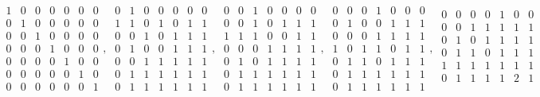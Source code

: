 \documentclass{amsart}
\begin{document}
$$ {\begin{smallmatrix}
1 & 0 & 0 & 0& 0& 0& 0 \\
0 & 1 & 0 & 0& 0& 0& 0 \\
0 & 0 & 1 & 0& 0& 0& 0 \\
0 & 0 & 0 & 1& 0& 0& 0 \\
0 & 0 & 0 & 0& 1& 0& 0 \\
0 & 0 & 0 & 0& 0& 1& 0 \\
0 & 0 & 0 & 0& 0& 0& 1
\end{smallmatrix} , \
\begin{smallmatrix}
0 & 1 & 0 & 0& 0& 0& 0 \\
1 & 1 & 0 & 1& 0& 1& 1 \\
0 & 0 & 1 & 0& 1& 1& 1 \\
0 & 1 & 0 & 0& 1& 1& 1 \\
0 & 0 & 1 & 1& 1& 1& 1 \\
0 & 1 & 1 & 1& 1& 1& 1 \\
0 & 1 & 1 & 1& 1& 1& 1
\end{smallmatrix} , \
\begin{smallmatrix}
0 & 0 & 1 & 0& 0& 0& 0 \\
0 & 0 & 1 & 0& 1& 1& 1 \\
1 & 1 & 1 & 0& 0& 1& 1 \\
0 & 0 & 0 & 1& 1& 1& 1 \\
0 & 1 & 0 & 1& 1& 1& 1 \\
0 & 1 & 1 & 1& 1& 1& 1 \\
0 & 1 & 1 & 1& 1& 1& 1
\end{smallmatrix} , \
\begin{smallmatrix}
0 & 0 & 0 & 1& 0& 0& 0 \\
0 & 1 & 0 & 0& 1& 1& 1 \\
0 & 0 & 0 & 1& 1& 1& 1 \\
1 & 0 & 1 & 1& 0& 1& 1 \\
0 & 1 & 1 & 0& 1& 1& 1 \\
0 & 1 & 1 & 1& 1& 1& 1 \\
0 & 1 & 1 & 1& 1& 1& 1
\end{smallmatrix} , \
\begin{smallmatrix}
0 & 0 & 0 & 0& 1& 0& 0 \\
0 & 0 & 1 & 1& 1& 1& 1 \\
0 & 1 & 0 & 1& 1& 1& 1 \\
0 & 1 & 1 & 0& 1& 1& 1 \\
1 & 1 & 1 & 1& 1& 1& 1 \\
0 & 1 & 1 & 1& 1& 2& 1 \\

\end{smallmatrix}}$$
\end{document}
